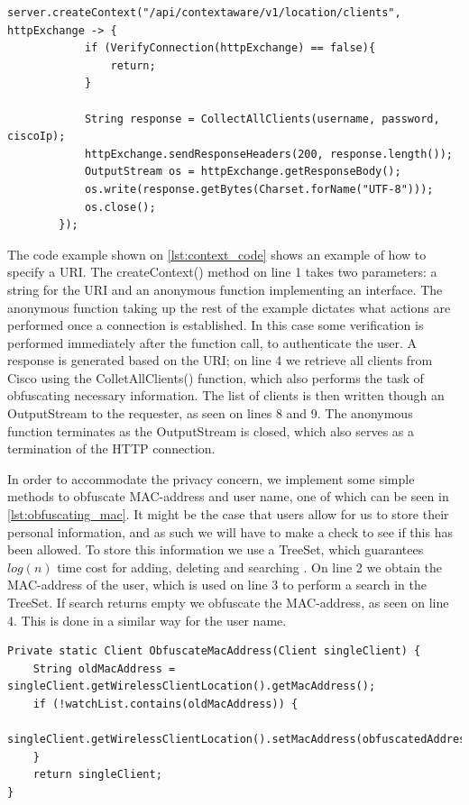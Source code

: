 \begin{lstlisting}[caption={Adding a URI},label={lst:context_code},language=inc_Java]
server.createContext("/api/contextaware/v1/location/clients", httpExchange -> {
            if (VerifyConnection(httpExchange) == false){
                return;
            }

            String response = CollectAllClients(username, password, ciscoIp);
            httpExchange.sendResponseHeaders(200, response.length());
            OutputStream os = httpExchange.getResponseBody();
            os.write(response.getBytes(Charset.forName("UTF-8")));
            os.close();
        });
\end{lstlisting}
The code example shown on \cref{lst:context_code} shows an example of how to specify a URI. The createContext() method on line 1 takes two parameters: a string for the URI and an anonymous function implementing an interface. The anonymous function taking up the rest of the example dictates what actions are performed once a connection is established. In this case some verification is performed immediately after the function call, to authenticate the user. A response is generated based on the URI; on line 4 we retrieve all clients from Cisco using the ColletAllClients() function, which also performs the task of obfuscating necessary information. The list of clients is then written though an OutputStream to the requester, as seen on lines 8 and 9. The anonymous function terminates as the OutputStream is closed, which also serves as a termination of the HTTP connection. 

In order to accommodate the privacy concern, we implement some simple methods to obfuscate MAC-address and user name, one of which can be seen in \cref{lst:obfuscating_mac}. It might be the case that users allow for us to store their personal information, and as such we will have to make a check to see if this has been allowed. To store this information we use a TreeSet, which guarantees $log(n)$ time cost for adding, deleting and searching \cite{treeset}. On line 2 we obtain the MAC-address of the user, which is used on line 3 to perform a search in the TreeSet. If search returns empty we obfuscate the MAC-address, as seen on line 4. This is done in a similar way for the user name.

\begin{lstlisting}[caption={Obfuscating mac-address},label={lst:obfuscating_mac},language=inc_Java]
Private static Client ObfuscateMacAddress(Client singleClient) {
    String oldMacAddress = singleClient.getWirelessClientLocation().getMacAddress();
    if (!watchList.contains(oldMacAddress)) {
        singleClient.getWirelessClientLocation().setMacAddress(obfuscatedAddress);
    }
    return singleClient;
}
\end{lstlisting}


